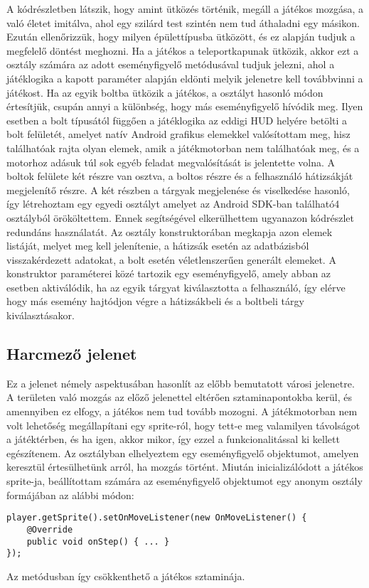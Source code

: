 A kódrészletben látszik, hogy amint ütközés történik, megáll a játékos mozgása, a való életet imitálva, ahol egy szilárd test szintén nem tud áthaladni egy másikon. 
Ezután ellenőrizzük, hogy milyen épülettípusba ütközött, és ez alapján tudjuk a megfelelő döntést meghozni. 
Ha a játékos a teleportkapunak ütközik, akkor ezt a  osztály számára az adott eseményfigyelő  metódusával tudjuk jelezni, ahol a játéklogika a kapott paraméter alapján eldönti melyik jelenetre kell továbbvinni a játékost. 
Ha az egyik boltba ütközik a játékos, a  osztályt hasonló módon értesítjük, csupán annyi a különbség, hogy más eseményfigyelő hívódik meg. 
Ilyen esetben a bolt típusától függően a játéklogika az eddigi HUD helyére betölti a bolt felületét, amelyet natív Android grafikus elemekkel valósítottam meg, hisz találhatóak rajta olyan elemek, amik a játékmotorban nem találhatóak meg, és a motorhoz adásuk túl sok egyéb feladat megvalósítását is jelentette volna. 
A boltok felülete két részre van osztva, a boltos részre és a felhasználó hátizsákját megjelenítő részre. 
A két részben a tárgyak megjelenése és viselkedése hasonló, így létrehoztam egy egyedi osztályt amelyet az Android SDK-ban található4  osztályból örököltettem. 
Ennek segítségével elkerülhettem ugyanazon kódrészlet redundáns használatát. 
Az osztály konstruktorában megkapja azon elemek listáját, melyet meg kell jelenítenie, a hátizsák esetén az adatbázisból visszakérdezett adatokat, a bolt esetén véletlenszerűen generált elemeket. 
A konstruktor paraméterei közé tartozik egy eseményfigyelő, amely abban az esetben aktiválódik, ha az egyik tárgyat kiválasztotta a felhasználó, így elérve hogy más esemény hajtódjon végre a hátizsákbeli és a boltbeli tárgy kiválasztásakor. 

\subsection*{Harcmező jelenet}
\label{harcmezo}
Ez a jelenet némely aspektusában hasonlít az előbb bemutatott városi jelenetre. 
A területen való mozgás az előző jelenettel eltérően sztaminapontokba kerül, és amennyiben ez elfogy, a játékos nem tud tovább mozogni. 
A játékmotorban nem volt lehetőség megállapítani egy sprite-ról, hogy tett-e meg valamilyen távolságot a játéktérben, és ha igen, akkor mikor, így ezzel a funkcionalitással ki kellett egészítenem. 
Az  osztályban elhelyeztem egy eseményfigyelő objektumot, amelyen keresztül értesülhetünk arról, ha mozgás történt. 
Miután inicializálódott a játékos sprite-ja, beállítottam számára az eseményfigyelő objektumot egy anonym osztály formájában az alábbi módon:
\begin{lstlisting}
player.getSprite().setOnMoveListener(new OnMoveListener() {
    @Override
    public void onStep() { ... }
});
\end{lstlisting}
Az  metódusban így csökkenthető a játékos sztaminája. 

